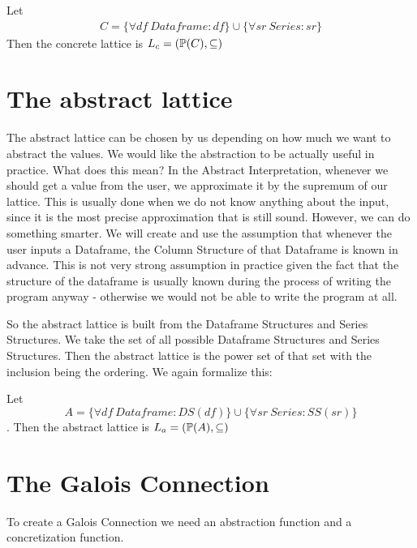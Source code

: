 \begin{defn}

    Let
    \begin{gather*}
        C = \{\forall df \: Dataframe: df\} \cup \{\forall sr \: Series: sr\}
    \end{gather*}
    Then the concrete lattice is $L_c = (\mathbb{P}(C), \subseteq)$
\end{defn}


\section{The abstract lattice}

The abstract lattice can be chosen by us depending on how much we want to abstract the values.
We would like the abstraction to be actually useful in practice.
What does this mean?
In the Abstract Interpretation, whenever we should get a value from the user, we approximate it by the supremum of our
lattice.
This is usually done when we do not know anything about the input, since it is the most precise approximation that is
still sound.
However, we can do something smarter.
We will create and use the assumption that whenever the user inputs a Dataframe, the Column Structure of that Dataframe
is known in advance.
This is not very strong assumption in practice given the fact that the structure of the dataframe is usually known
during the process of writing the program anyway - otherwise we would not be able to write the program at all.

So the abstract lattice is built from the Dataframe Structures and Series Structures.
We take the set of all possible Dataframe Structures and Series Structures.
Then the abstract lattice is the power set of that set with the inclusion being the ordering.
We again formalize this:

\begin{defn}

    Let
    \[A = \{\forall df\: Dataframe: DS(df)\} \cup \{\forall sr \: Series: SS(sr)\}\].
    Then the abstract lattice is $L_a = (\mathbb{P}(A), \subseteq)$
\end{defn}

\section{The Galois Connection}

To create a Galois Connection we need an abstraction function and a concretization function.

